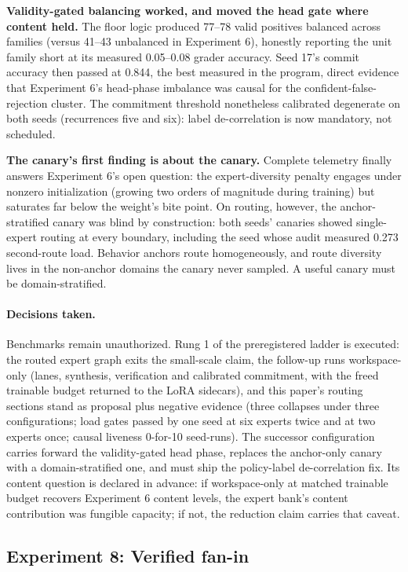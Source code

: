 \documentclass[10pt,a4paper]{article}
\begin{document}
\textbf{Validity-gated balancing worked, and moved the head gate where
content held.} The floor logic produced 77--78 valid positives balanced
across families (versus 41--43 unbalanced in Experiment 6), honestly reporting the
unit family short at its measured 0.05--0.08 grader accuracy. Seed 17's
commit accuracy then passed at 0.844, the best measured in the program,
direct evidence that Experiment 6's head-phase imbalance was causal for the
confident-false-rejection cluster. The commitment threshold nonetheless
calibrated degenerate on both seeds (recurrences five and six): label
de-correlation is now mandatory, not scheduled.

\textbf{The canary's first finding is about the canary.} Complete telemetry
finally answers Experiment 6's open question: the expert-diversity penalty engages
under nonzero initialization (growing two orders of magnitude during
training) but saturates far below the weight's bite point. On routing,
however, the anchor-stratified canary was blind by construction: both seeds'
canaries showed single-expert routing at every boundary, including the seed
whose audit measured 0.273 second-route load. Behavior anchors route
homogeneously, and route diversity lives in the non-anchor domains the canary
never sampled. A useful canary must be domain-stratified.

\paragraph{Decisions taken.}
Benchmarks remain unauthorized. Rung 1 of the preregistered ladder is
executed: the routed expert graph exits the small-scale claim, the follow-up
runs workspace-only (lanes, synthesis, verification and calibrated
commitment, with the freed trainable budget returned to the LoRA sidecars),
and this paper's routing sections stand as proposal plus negative evidence
(three collapses under three configurations; load gates passed by one seed at
six experts twice and at two experts once; causal liveness 0-for-10
seed-runs). The successor configuration carries forward the validity-gated head phase, replaces the
anchor-only canary with a domain-stratified one, and must ship the
policy-label de-correlation fix. Its content question is declared in advance:
if workspace-only at matched trainable budget recovers Experiment 6 content
levels, the expert bank's content contribution was fungible capacity; if not,
the reduction claim carries that caveat.

\subsection{Experiment 8: Verified fan-in}
\label{sec:study8}
\end{document}
